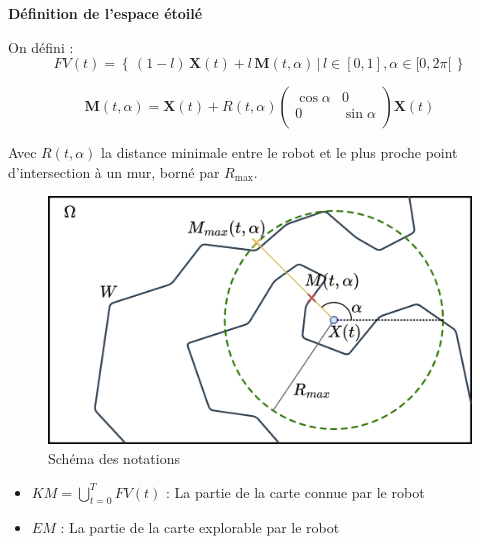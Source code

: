 \documentclass[aspectratio=169,10pt]{beamer}
\begin{document}
\begin{frame}[t]{\textbf{Définition de l'espace étoilé}}
	\begin{minipage}[t]{0.6\linewidth}
		On défini :
		\begin{equation*}
			\displaystyle
			FV(t) = \left\{ \, (1 - l) \, \mathbf{X}(t) + l\, \mathbf{M}(t, \alpha) \,|\, l \in [0, 1], \alpha \in [0, 2 \pi[ \, \right\}
		\end{equation*}
			
		\begin{equation*}
			\mathbf{M}(t, \alpha) = \mathbf{X}(t) + R(t, \alpha) 
			\begin{pmatrix}
				\cos \alpha & 0\\
				0 & \sin \alpha\\
			\end{pmatrix} 
			\mathbf{X}(t)
		\end{equation*}
	
		Avec $R(t, \alpha)$ la distance minimale entre le robot et le plus proche point d'intersection à un mur, borné par $R_{\max}$.
	\end{minipage}
	\hfill
	\begin{minipage}[t]{0.38\linewidth}
		\begin{figure}
			\centering
			\includegraphics[width=\textwidth]{IMAGES/math_nota.png}
			\caption{Schéma des notations}
			\label{fig:math_notation}
		\end{figure}
	\end{minipage}
	
	\begin{itemize}
		\item $\displaystyle KM = \bigcup_{t=0}^{T} FV(t)$ : La partie de la carte connue par le robot
		\item $EM$ : La partie de la carte explorable par le robot
	\end{itemize}

\end{frame}
\end{document}
